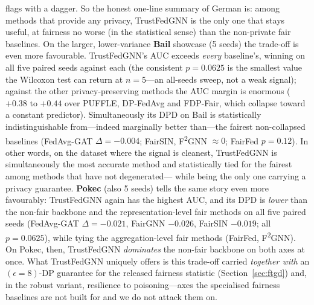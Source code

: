 \documentclass[pdflatex,sn-mathphys-num]{sn-jnl}
\theoremstyle{thmstyleone}%
\theoremstyle{thmstyletwo}%
\theoremstyle{thmstylethree}%
\begin{document}
flags with a dagger. So the honest one-line summary of German is: among methods
that provide any privacy, TrustFedGNN is the only one that stays useful, at
fairness no worse (in the statistical sense) than the non-private fair baselines.
On the larger, lower-variance \textbf{Bail} showcase (5 seeds) the trade-off is
even more favourable. TrustFedGNN's AUC exceeds \emph{every} baseline's, winning
on all five paired seeds against each (the consistent $p{=}0.0625$ is the
smallest value the Wilcoxon test can return at $n{=}5$---an all-seeds sweep, not
a weak signal); against the other privacy-preserving methods the AUC margin is
enormous ($+0.38$ to $+0.44$ over PUFFLE, DP-FedAvg and FDP-Fair, which collapse
toward a constant predictor). Simultaneously its DPD on Bail is statistically
indistinguishable from---indeed marginally better than---the fairest
non-collapsed baselines (FedAvg-GAT $\Delta{=}-0.004$; FairSIN, F\textsuperscript{2}GNN
$\approx 0$; FairFed $p{=}0.12$). In other words, on the dataset where the
signal is cleanest, TrustFedGNN is simultaneously the most accurate method and
statistically tied for the fairest among methods that have not degenerated---
while being the only one carrying a privacy guarantee. \textbf{Pokec} (also 5
seeds) tells the same story even more favourably: TrustFedGNN again has the
highest AUC, and its DPD is \emph{lower} than the non-fair backbone and the
representation-level fair methods on all five paired seeds
(FedAvg-GAT $\Delta{=}-0.021$, FairGNN $-0.026$, FairSIN $-0.019$; all
$p{=}0.0625$), while tying the aggregation-level fair methods (FairFed, F\textsuperscript{2}GNN).
On Pokec, then, TrustFedGNN \emph{dominates} the non-fair backbone on both axes
at once. What TrustFedGNN uniquely offers is this trade-off carried
\emph{together with} an $(\epsilon{=}8)$-DP guarantee for the released fairness
statistic (Section~\ref{sec:ftgd}) and, in the robust variant, resilience to
poisoning---axes the specialised fairness baselines are not built for and we do
not attack them on.

\begin{table}[t]\centering
\caption{Paired Wilcoxon signed-rank tests (TrustFedGNN vs.\ each baseline over
shared seeds): $p$-values \emph{rounded to two decimals}, $^{*}$ marks
$p<0.05$; where the running text quotes a $p$-value it quotes this rounded
value. ``--'' where fewer than five
shared seeds are available (Credit/Elliptic remain at 2--3 seeds by cost, and
are run against a restricted baseline set---see Section~\ref{sec:setup}). Note
the Wilcoxon floor: at $n{=}5$ (Bail, Pokec) the smallest attainable $p$ is
$0.0625$, so a uniform $0.06$ indicates our method wins on \emph{all five} paired
seeds, not a weak effect. On German (10 seeds) TrustFedGNN's DPD is \emph{not}
significantly different from the non-fair backbone or most fair baselines; its
AUC is significantly higher than the other (collapsing) privacy methods and lower
than the non-private ones. On Bail its AUC beats every baseline on all seeds
while its DPD ties the fairest non-collapsed methods; on Pokec it beats the
backbone on \emph{both} axes on all seeds.}
\label{tab:significance}
{\footnotesize\setlength{\tabcolsep}{4pt}}
\end{table}
\end{document}
